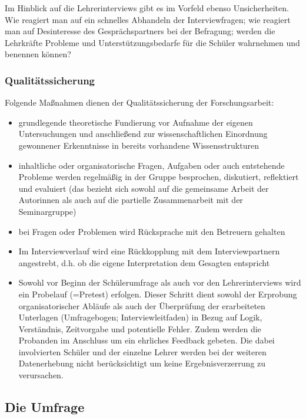 Im Hinblick auf die Lehrerinterviews gibt es im Vorfeld ebenso Unsicherheiten. Wie reagiert man auf ein schnelles Abhandeln der Interviewfragen; wie reagiert man auf Desinteresse des Gesprächspartners bei der Befragung; werden die Lehrkräfte Probleme und Unterstützungsbedarfe für die Schüler wahrnehmen und benennen können? 


\subsubsection{Qualitätssicherung}
\label{sec:Qualitätssicherung}

Folgende Maßnahmen dienen der Qualitätssicherung der Forschungsarbeit:\\
\begin{itemize}
	\item grundlegende theoretische Fundierung vor Aufnahme der eigenen Untersuchungen und anschließend zur wissenschaftlichen Einordnung gewonnener Erkenntnisse in bereits vorhandene Wissensstrukturen
	\item inhaltliche oder organisatorische Fragen, Aufgaben oder auch entstehende Probleme  werden regelmäßig in der Gruppe besprochen, diskutiert, reflektiert und evaluiert (das bezieht sich sowohl auf die gemeinsame Arbeit der Autorinnen als auch auf die partielle Zusammenarbeit mit der Seminargruppe)
	\item bei Fragen oder Problemen wird Rücksprache mit den Betreuern gehalten
	\item Im Interviewverlauf wird eine Rückkopplung mit dem Interviewpartnern angestrebt, d.h. ob die eigene Interpretation dem Gesagten entspricht
	\item Sowohl vor Beginn der Schülerumfrage als auch vor den Lehrerinterviews wird ein Probelauf (=Pretest) erfolgen. Dieser Schritt dient sowohl der Erprobung organisatorischer Abläufe als auch der Überprüfung der erarbeiteten Unterlagen (Umfragebogen; Interviewleitfaden) in Bezug auf Logik, Verständnis, Zeitvorgabe und potentielle Fehler. Zudem werden die Probanden im Anschluss um ein ehrliches Feedback gebeten. Die dabei involvierten Schüler und der einzelne Lehrer werden bei der weiteren Datenerhebung nicht berücksichtigt um keine Ergebnisverzerrung zu verursachen.
\end{itemize}

\subsection{Die Umfrage}
\label{sec:DieUmfrage}

